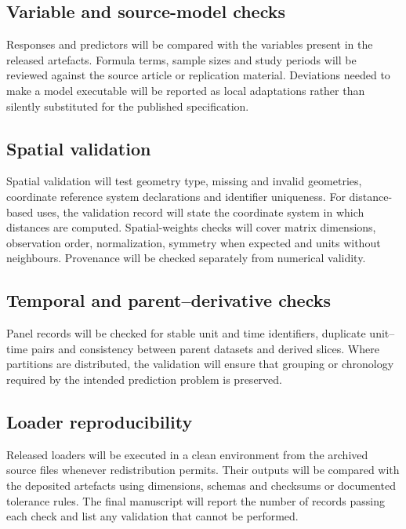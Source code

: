\documentclass[10pt,a4paper]{article}
\begin{document}
\subsection*{Variable and source-model checks}

Responses and predictors will be compared with the variables present in the
released artefacts. Formula terms, sample sizes and study periods will be
reviewed against the source article or replication material. Deviations needed
to make a model executable will be reported as local adaptations rather than
silently substituted for the published specification.

\subsection*{Spatial validation}

Spatial validation will test geometry type, missing and invalid geometries,
coordinate reference system declarations and identifier uniqueness. For
distance-based uses, the validation record will state the coordinate system
in which distances are computed. Spatial-weights checks will cover matrix
dimensions, observation order, normalization, symmetry when expected and
units without neighbours. Provenance will be checked separately from numerical
validity.

\subsection*{Temporal and parent--derivative checks}

Panel records will be checked for stable unit and time identifiers, duplicate
unit--time pairs and consistency between parent datasets and derived slices.
Where partitions are distributed, the validation will ensure that grouping or
chronology required by the intended prediction problem is preserved.

\subsection*{Loader reproducibility}

Released loaders will be executed in a clean environment from the archived
source files whenever redistribution permits. Their outputs will be compared
with the deposited artefacts using dimensions, schemas and checksums or
documented tolerance rules. The final manuscript will report the number of
records passing each check and list any validation that cannot be performed.
\end{document}
